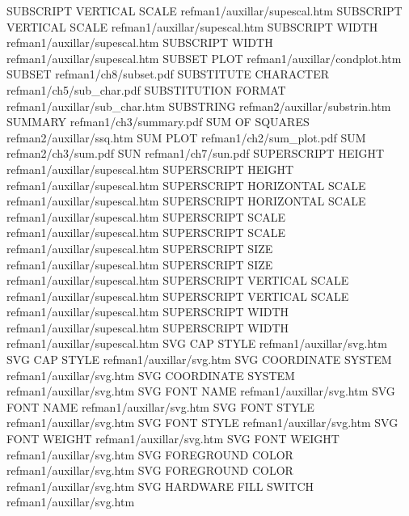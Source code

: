 SUBSCRIPT VERTICAL SCALE                refman1/auxillar/supescal.htm
SUBSCRIPT VERTICAL SCALE                refman1/auxillar/supescal.htm
SUBSCRIPT WIDTH                         refman1/auxillar/supescal.htm
SUBSCRIPT WIDTH                         refman1/auxillar/supescal.htm
SUBSET PLOT                             refman1/auxillar/condplot.htm
SUBSET                                  refman1/ch8/subset.pdf
SUBSTITUTE CHARACTER                    refman1/ch5/sub_char.pdf
SUBSTITUTION FORMAT                     refman1/auxillar/sub_char.htm
SUBSTRING                               refman2/auxillar/substrin.htm
SUMMARY                                 refman1/ch3/summary.pdf
SUM OF SQUARES                          refman2/auxillar/ssq.htm
SUM PLOT                                refman1/ch2/sum_plot.pdf
SUM                                     refman2/ch3/sum.pdf
SUN                                     refman1/ch7/sun.pdf
SUPERSCRIPT HEIGHT                      refman1/auxillar/supescal.htm
SUPERSCRIPT HEIGHT                      refman1/auxillar/supescal.htm
SUPERSCRIPT HORIZONTAL SCALE            refman1/auxillar/supescal.htm
SUPERSCRIPT HORIZONTAL SCALE            refman1/auxillar/supescal.htm
SUPERSCRIPT SCALE                       refman1/auxillar/supescal.htm
SUPERSCRIPT SCALE                       refman1/auxillar/supescal.htm
SUPERSCRIPT SIZE                        refman1/auxillar/supescal.htm
SUPERSCRIPT SIZE                        refman1/auxillar/supescal.htm
SUPERSCRIPT VERTICAL SCALE              refman1/auxillar/supescal.htm
SUPERSCRIPT VERTICAL SCALE              refman1/auxillar/supescal.htm
SUPERSCRIPT WIDTH                       refman1/auxillar/supescal.htm
SUPERSCRIPT WIDTH                       refman1/auxillar/supescal.htm
SVG CAP STYLE                           refman1/auxillar/svg.htm
SVG CAP STYLE                           refman1/auxillar/svg.htm
SVG COORDINATE SYSTEM                   refman1/auxillar/svg.htm
SVG COORDINATE SYSTEM                   refman1/auxillar/svg.htm
SVG FONT NAME                           refman1/auxillar/svg.htm
SVG FONT NAME                           refman1/auxillar/svg.htm
SVG FONT STYLE                          refman1/auxillar/svg.htm
SVG FONT STYLE                          refman1/auxillar/svg.htm
SVG FONT WEIGHT                         refman1/auxillar/svg.htm
SVG FONT WEIGHT                         refman1/auxillar/svg.htm
SVG FOREGROUND COLOR                    refman1/auxillar/svg.htm
SVG FOREGROUND COLOR                    refman1/auxillar/svg.htm
SVG HARDWARE FILL SWITCH                refman1/auxillar/svg.htm
